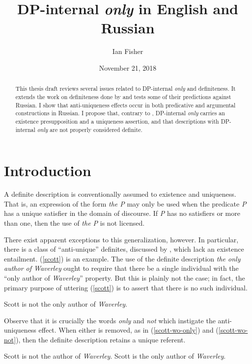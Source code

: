 \documentclass{article}
\title{DP-internal \textit{only} in English and Russian}
\author{Ian Fisher}
\date{November 21, 2018}
\begin{document}
\maketitle

\begin{abstract}
This thesis draft reviews several issues related to DP-internal \textit{only} and definiteness. It extends the work on definiteness done by \citet{cb2012a, cb2012b, cb2015} and tests some of their predictions against Russian. I show that anti-uniqueness effects occur in both predicative and argumental constructions in Russian. I propose that, contrary to \citet{cb2015}, DP-internal \textit{only} carries an existence presupposition and a uniqueness assertion, and that descriptions with DP-internal \textit{only} are not properly considered definite.
\end{abstract}


\section{Introduction \label{sec:intro}}
A definite description is conventionally assumed to existence and uniqueness. That is, an expression of the form \textit{the P} may only be used when the predicate \textit{P} has a unique satisfier in the domain of discourse. If \textit{P} has no satisfiers or more than one, then the use of \textit{the P} is not licensed.

There exist apparent exceptions to this generalization, however. In particular, there is a class of ``anti-unique'' definites, discussed by \citet{cb2015}, which lack an existence entailment. (\ref{scott}) is an example. The use of the definite description \textit{the only author of Waverley} ought to require that there be a single individual with the ``only author of \textit{Waverley}'' property. But this is plainly not the case; in fact, the primary purpose of uttering (\ref{scott}) is to assert that there is no such individual.

\begin{exe}
	\ex \label{scott} Scott is not the only author of \textit{Waverley}.
\end{exe}

Observe that it is crucially the words \textit{only} and \textit{not} which instigate the anti-uniqueness effect. When either is removed, as in (\ref{scott-wo-only}) and (\ref{scott-wo-not}), then the definite description retains a unique referent.

\begin{exe}
	\ex \label{scott-wo-only} Scott is not the author of \textit{Waverley}.
	\ex \label{scott-wo-not} Scott is the only author of \textit{Waverley}.
\end{exe}
\end{document}

